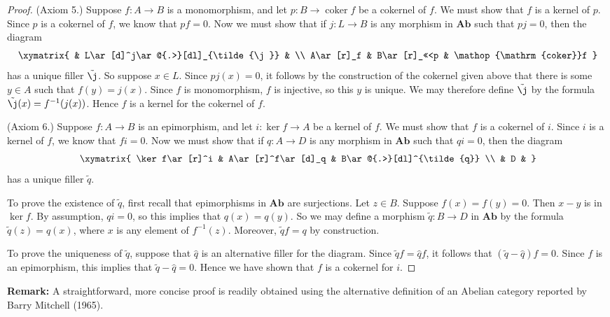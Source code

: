 \documentclass[12pt]{article}
\newcommand{\Ab}{\mathbf{Ab}}
\DeclareMathOperator{\coker}{coker}
\begin{document}
\begin{proof}
(Axiom 5.) Suppose $f\colon A\to B$ is a monomorphism, and let $p\colon B\to\coker f$ be  a cokernel of $f$.  We must show that $f$ is a kernel of $p$.  Since $p$ is a cokernel of $f$, we know that $pf = 0$.  Now we must show that if $j\colon L\to B$ is any morphism in $\Ab$ such that $pj = 0$, then the diagram
\[\xymatrix{
          & L\ar[d]^j\ar@{.>}[dl]_{\tilde{\j}} &   \\
A\ar[r]_f & B\ar[r]_<<<p                       & \coker f
}\]
has a unique filler $\tilde{\j}$.  So suppose $x\in L$.  Since $pj(x) = 0$, it follows by the construction of the cokernel given above that there is some $y\in A$ such that $f(y) = j(x)$.  Since $f$ is monomorphism, $f$ is injective, so this $y$ is unique.  We may therefore define $\tilde{\j}$ by the formula $\tilde{\j}(x) = f^{-1}(j(x))$.  Hence $f$ is a kernel for the cokernel of $f$.

(Axiom 6.) Suppose $f\colon A\to B$ is an epimorphism, and let $i\colon \ker f\to A$ be a kernel of $f$.  We must show that $f$ is a cokernel of $i$.  Since $i$ is a kernel of $f$, we know that $fi = 0$.  Now we must show that if $q\colon A\to D$ is any morphism in $\Ab$ such that $qi=0$, then the diagram
\[\xymatrix{
\ker f\ar[r]^i & A\ar[r]^f\ar[d]_q & B\ar@{.>}[dl]^{\tilde{q}} \\
               & D                 &
}\]
has a unique filler $\tilde{q}$.

To prove the existence of $\tilde{q}$, first recall that epimorphisms in $\Ab$ are surjections.  Let $z\in B$.  Suppose $f(x)=f(y)=0$.  Then $x-y$ is in $\ker f$.  By assumption, $qi=0$, so this implies that $q(x)=q(y)$.  So we may define a morphism $\tilde{q}\colon B\to D$ in $\Ab$ by the formula $\tilde{q}(z) = q(x)$, where $x$ is any element of $f^{-1}(z)$.  Moreover, $\tilde{q}f = q$ by construction.

To prove the uniqueness of $\tilde{q}$, suppose that $\hat{q}$ is an alternative filler for the diagram.  Since $\tilde{q}f = \hat{q}f$, it follows that $(\tilde{q}-\hat{q})f=0$.  Since $f$ is an epimorphism, this implies that $\tilde{q}-\hat{q}=0$.  Hence we have shown that $f$ is a cokernel for $i$.
\end{proof}

\textbf{Remark:}
A straightforward, more concise proof is readily obtained using the alternative definition of an Abelian category 
reported by Barry Mitchell (1965). 
\end{document}
